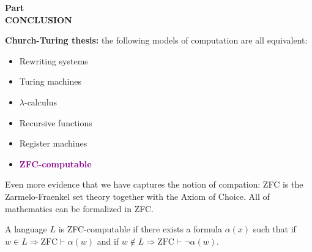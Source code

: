 \begin{frame}
\begin{center}
\addtocounter{part}{1}
{\bf Part  \\ CONCLUSION}
\end{center}
\end{frame}

\begin{frame}

{\bf Church-Turing thesis:} the following models of computation are
all equivalent:

\begin{itemize}
\item  Rewriting systems
\item  Turing machines
\item  $\lambda$-calculus
\item  Recursive functions
\item  Register machines
\item  \textcolor{darkmagenta}{\bf ZFC-computable}
\end{itemize}

Even more evidence that we have captures the notion of compation: ZFC
is the Zarmelo-Fraenkel set theory together with the Axiom of Choice.
All of mathematics can be formalized in ZFC.

A language $L$ is ZFC-computable if there exists a formula
$\alpha(x)$ such that if $w\in L\Rightarrow\text{ZFC}\vdash\alpha(w)$
and if $w\not\in L\Rightarrow\text{ZFC}\vdash\neg\alpha(w)$.
\end{frame}


